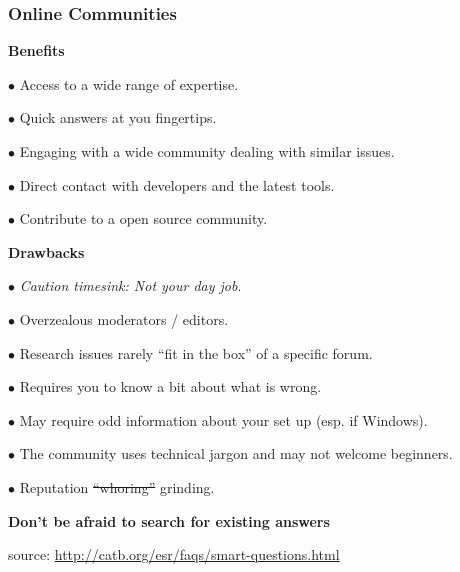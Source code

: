 \documentclass{beamer}
\begin{document}
  \begin{frame}[shrink=15]
    \frametitle{Online Communities}
    
     \begin{center}
      \textbf{Benefits}
     \end{center}
     
    $\bullet$ Access to a wide range of expertise.

    $\bullet$ Quick answers at you fingertips.

    $\bullet$ Engaging with a wide community dealing with similar issues.

    $\bullet$ Direct contact with developers and the latest tools.
    
    $\bullet$ Contribute to a open source community.
    
     \begin{center}
      \textbf{Drawbacks}
     \end{center}
     
    $\bullet$ \textit{Caution timesink: Not your day job}.

    $\bullet$ Overzealous moderators / editors.

    $\bullet$ Research issues rarely ``fit in the box'' of a specific forum.

    $\bullet$ Requires you to know a bit about what is wrong.

    $\bullet$ May require odd information about your set up (esp. if Windows).
    
    $\bullet$ The community uses technical jargon and may not welcome beginners.
    
    $\bullet$ Reputation \st{``whoring''} grinding. 
    
     \begin{center}
      \textbf{Don't be afraid to search for existing answers}
     \end{center}
     
     source: \url{http://catb.org/esr/faqs/smart-questions.html}
     
     \end{frame}
\end{document}
